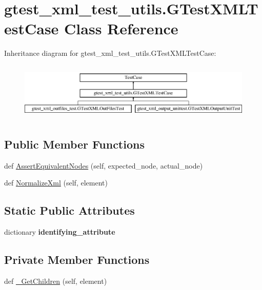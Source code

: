 \hypertarget{classgtest__xml__test__utils_1_1_g_test_x_m_l_test_case}{}\section{gtest\+\_\+xml\+\_\+test\+\_\+utils.\+G\+Test\+X\+M\+L\+Test\+Case Class Reference}
\label{classgtest__xml__test__utils_1_1_g_test_x_m_l_test_case}
Inheritance diagram for gtest\+\_\+xml\+\_\+test\+\_\+utils.\+G\+Test\+X\+M\+L\+Test\+Case\+:\begin{figure}[H]
\begin{center}
\leavevmode
\includegraphics[height=2.781457cm]{classgtest__xml__test__utils_1_1_g_test_x_m_l_test_case}
\end{center}
\end{figure}
\subsection*{Public Member Functions}
\begin{DoxyCompactItemize}
\item 
def \mbox{\hyperlink{classgtest__xml__test__utils_1_1_g_test_x_m_l_test_case_a977273e8863f4f41d121bb5a64b08d32}{Assert\+Equivalent\+Nodes}} (self, expected\+\_\+node, actual\+\_\+node)
\item 
def \mbox{\hyperlink{classgtest__xml__test__utils_1_1_g_test_x_m_l_test_case_ac4823e96c3b5327b25a340a3605447d9}{Normalize\+Xml}} (self, element)
\end{DoxyCompactItemize}
\subsection*{Static Public Attributes}
\begin{DoxyCompactItemize}
\item 
dictionary {\bfseries identifying\+\_\+attribute}
\end{DoxyCompactItemize}
\subsection*{Private Member Functions}
\begin{DoxyCompactItemize}
\item 
def \mbox{\hyperlink{classgtest__xml__test__utils_1_1_g_test_x_m_l_test_case_a7f487435d29e1b2300af000d36ff4f5e}{\+\_\+\+Get\+Children}} (self, element)
\end{DoxyCompactItemize}


